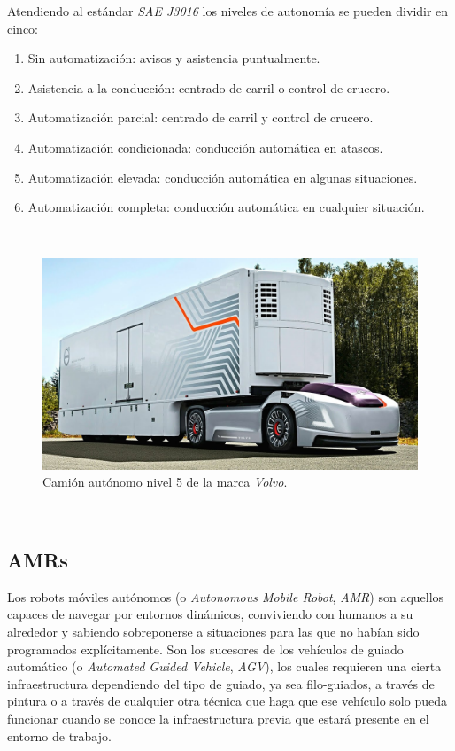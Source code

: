 Atendiendo al estándar \textit{SAE J3016} \cite{saej3016} los niveles de autonomía se pueden dividir en cinco:
\begin{enumerate}
	\item Sin automatización: avisos y asistencia puntualmente.
	\item Asistencia a la conducción: centrado de carril o control de crucero.
	\item Automatización parcial: centrado de carril y control de crucero.
	\item Automatización condicionada: conducción automática en atascos.
	\item Automatización elevada: conducción automática en algunas situaciones.
	\item Automatización completa: conducción automática en cualquier situación.
\end{enumerate}\

\begin{figure} [h!]
	\begin{center}
		\includegraphics[width=12cm]{figs/volvovera}
	\end{center}
	\caption{Camión autónomo nivel 5 de la marca \textit{Volvo}.}
	\label{fig:volvovera}
\end{figure}\

\subsection{AMRs}
\label{sec:amr}
Los robots móviles autónomos (o \textit{Autonomous Mobile Robot}, \textit{AMR}) son aquellos capaces de navegar por entornos dinámicos, conviviendo con humanos a su alrededor y sabiendo sobreponerse a situaciones para las que no habían sido programados explícitamente. Son los sucesores de los vehículos de guiado automático (o \textit{Automated Guided Vehicle}, \textit{AGV}), los cuales requieren una cierta infraestructura dependiendo del tipo de guiado, ya sea filo-guiados, a través de pintura o a través de cualquier otra técnica que haga que ese vehículo solo pueda funcionar cuando se conoce la infraestructura previa que estará presente en el entorno de trabajo.\\

